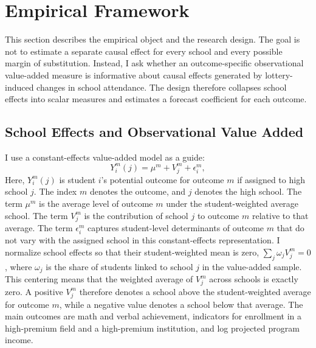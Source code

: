 \documentclass[a4paper, article, english, oneside, unknownkeysallowed, 12pt]{memoir}
\begin{document}
\clearpage 
\section{Empirical Framework}

This section describes the empirical object and the research design.
The goal is not to estimate a separate causal effect for every school and every possible margin of substitution.
Instead, I ask whether an outcome-specific observational value-added measure is informative about causal effects generated by lottery-induced changes in school attendance.
The design therefore collapses school effects into scalar measures and estimates a forecast coefficient for each outcome.

\subsection{School Effects and Observational Value Added}

I use a constant-effects value-added model as a guide:
\begin{equation}
  Y_i^m(j) = \mu^m + V_j^m + \epsilon_i^m,
  \label{eq:potential-va}
\end{equation}
Here, $Y_i^m(j)$ is student $i$'s potential outcome for outcome $m$ if assigned to high school $j$.
The index $m$ denotes the outcome, and $j$ denotes the high school.
The term $\mu^m$ is the average level of outcome $m$ under the student-weighted average school.
The term $V_j^m$ is the contribution of school $j$ to outcome $m$ relative to that average.
The term $\epsilon_i^m$ captures student-level determinants of outcome $m$ that do not vary with the assigned school in this constant-effects representation.
I normalize school effects so that their student-weighted mean is zero, $\sum_j \omega_j V_j^m = 0$, where $\omega_j$ is the share of students linked to school $j$ in the value-added sample.
This centering means that the weighted average of $V_j^m$ across schools is exactly zero.
A positive $V_j^m$ therefore denotes a school above the student-weighted average for outcome $m$, while a negative value denotes a school below that average.
The main outcomes are math and verbal achievement, indicators for enrollment in a high-premium field and a high-premium institution, and log projected program income. 
\end{document}
